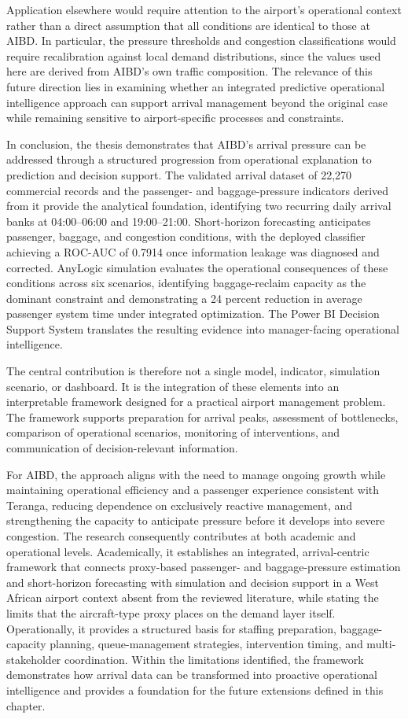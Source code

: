 Application elsewhere would require attention to the airport's operational context rather than a direct assumption that all conditions are identical to those at AIBD. In particular, the pressure thresholds and congestion classifications would require recalibration against local demand distributions, since the values used here are derived from AIBD’s own traffic composition. The relevance of this future direction lies in examining whether an integrated predictive operational intelligence approach can support arrival management beyond the original case while remaining sensitive to airport-specific processes and constraints.

In conclusion, the thesis demonstrates that AIBD’s arrival pressure can be addressed through a structured progression from operational explanation to prediction and decision support. The validated arrival dataset of 22,270 commercial records and the passenger- and baggage-pressure indicators derived from it provide the analytical foundation, identifying two recurring daily arrival banks at 04:00--06:00 and 19:00--21:00. Short-horizon forecasting anticipates passenger, baggage, and congestion conditions, with the deployed classifier achieving a ROC-AUC of 0.7914 once information leakage was diagnosed and corrected. AnyLogic simulation evaluates the operational consequences of these conditions across six scenarios, identifying baggage-reclaim capacity as the dominant constraint and demonstrating a 24 percent reduction in average passenger system time under integrated optimization. The Power BI Decision Support System translates the resulting evidence into manager-facing operational intelligence.

The central contribution is therefore not a single model, indicator, simulation scenario, or dashboard. It is the integration of these elements into an interpretable framework designed for a practical airport management problem. The framework supports preparation for arrival peaks, assessment of bottlenecks, comparison of operational scenarios, monitoring of interventions, and communication of decision-relevant information.

For AIBD, the approach aligns with the need to manage ongoing growth while maintaining operational efficiency and a passenger experience consistent with Teranga, reducing dependence on exclusively reactive management, and strengthening the capacity to anticipate pressure before it develops into severe congestion. The research consequently contributes at both academic and operational levels. Academically, it establishes an integrated, arrival-centric framework that connects proxy-based passenger- and baggage-pressure estimation and short-horizon forecasting with simulation and decision support in a West African airport context absent from the reviewed literature, while stating the limits that the aircraft-type proxy places on the demand layer itself. Operationally, it provides a structured basis for staffing preparation, baggage-capacity planning, queue-management strategies, intervention timing, and multi-stakeholder coordination. Within the limitations identified, the framework demonstrates how arrival data can be transformed into proactive operational intelligence and provides a foundation for the future extensions defined in this chapter.